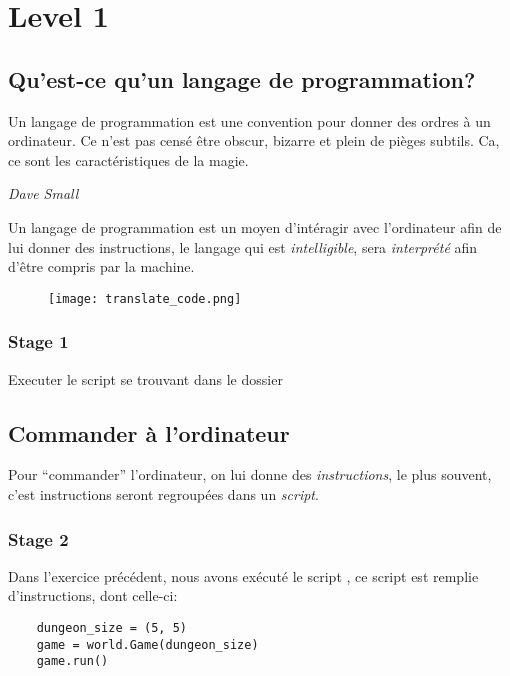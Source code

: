 \chapter{Level 1}


\section{Qu’est-ce qu’un langage de programmation?}

\epigraph{Un langage de programmation est une convention pour donner des ordres à un ordinateur. Ce n’est pas censé être obscur, bizarre et plein de pièges subtils.
Ca, ce sont les caractéristiques de la magie.}{\textit{Dave Small}}

Un langage de programmation est un moyen d’intéragir avec l’ordinateur afin de lui donner des instructions, le langage qui est \emph{intelligible}, 
sera \emph{interprété} afin d’être compris par la machine.

\begin{figure}[ht]
\centering
\texttt{[image: translate\_code.png]} 
\end{figure}

\subsection{Stage 1}
 
Executer le script se trouvant dans le dossier 

\section{Commander à l'ordinateur}

Pour ``commander'' l’ordinateur, on lui donne des \emph{instructions}, le plus souvent, c’est instructions seront regroupées dans un \emph{script}.

\subsection{Stage 2}

Dans l’exercice précédent, nous avons exécuté le script , ce script est remplie d’instructions, dont celle-ci:

\begin{lstlisting}
    dungeon_size = (5, 5)
    game = world.Game(dungeon_size)
    game.run()
\end{lstlisting}

